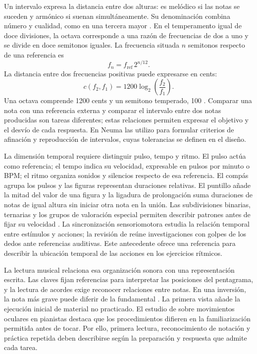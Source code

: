 Un intervalo expresa la distancia entre dos alturas: es melódico si las notas
se suceden y armónico si suenan simultáneamente. Su denominación combina número
y cualidad, como en una tercera mayor
\parencite[sección~5.1]{hutchinsonIntervalos}. En el temperamento igual de doce
divisiones, la octava corresponde a una razón de frecuencias de dos a uno y se
divide en doce semitonos iguales. La frecuencia situada \(n\) semitonos respecto
de una referencia es
\begin{equation}
  f_n=f_{\mathrm{ref}}\,2^{n/12}.
  \label{eq:frecuencia-semitonos}
\end{equation}
La distancia entre dos frecuencias positivas puede expresarse en cents:
\begin{equation}
  c(f_2,f_1)=1200\log_2\left(\frac{f_2}{f_1}\right).
  \label{eq:distancia-cents}
\end{equation}
Una octava comprende 1200 cents y un semitono temperado, 100
\parencite{wolfeNotasFrecuencias}. Comparar una nota con una referencia externa
y comparar el intervalo entre dos notas producidas son tareas diferentes;
estas relaciones permiten expresar el objetivo y el desvío de cada respuesta.
En Neuma las utilizo para formular criterios de afinación y reproducción de
intervalos, cuyas tolerancias se definen en el diseño.

La dimensión temporal requiere distinguir pulso, tempo y ritmo. El pulso actúa
como referencia; el tempo indica su velocidad, expresable en pulsos por minuto
o BPM; el ritmo organiza sonidos y silencios respecto de esa referencia. El
compás agrupa los pulsos y las figuras representan duraciones relativas.
El puntillo añade la mitad del valor de una figura y la ligadura de prolongación
suma duraciones de notas de igual altura sin iniciar otra nota en la unión.
Las subdivisiones binarias, ternarias y los grupos de valoración especial
permiten describir patrones antes de fijar su velocidad
\parencite[secciones~4.2--4.5]{hutchinsonIntervalos}.
La sincronización sensoriomotora estudia la relación temporal entre estímulos
y acciones; la revisión de \textcite{repp2005synchronization} reúne investigaciones
con golpes de los dedos ante referencias auditivas. Este antecedente ofrece una
referencia para describir la ubicación temporal de las acciones en los ejercicios
rítmicos.

La lectura musical relaciona esa organización sonora con una representación
escrita. Las claves fijan referencias para interpretar las posiciones del
pentagrama, y la lectura de acordes exige reconocer relaciones entre notas.
En una inversión, la nota más grave puede diferir de la fundamental
\parencite[secciones~1.2, 6.1, 6.3 y 8.1]{hutchinsonIntervalos}. La primera vista
añade la ejecución inicial de material no practicado. El estudio de
\textcite{imai2021sightreading} sobre movimientos oculares en pianistas destaca
que los procedimientos difieren en la familiarización permitida antes de tocar.
Por ello, primera lectura, reconocimiento de notación y práctica repetida deben
describirse según la preparación y respuesta que admite cada tarea.

